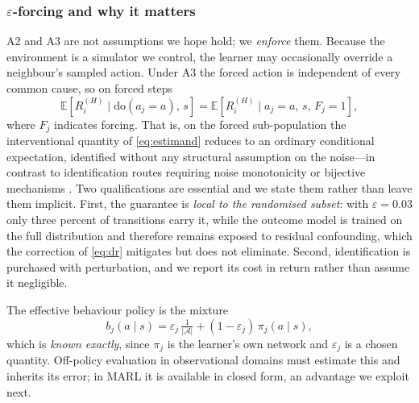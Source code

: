 \documentclass[conference]{IEEEtran}
\begin{document}
\subsubsection{$\varepsilon$-forcing and why it matters}
A2 and A3 are not assumptions we hope hold; we \emph{enforce} them. Because the environment is a simulator we control, the learner may occasionally override a neighbour's sampled action. Under A3 the forced action is independent of every common cause, so on forced steps
\begin{equation}
\mathbb{E}\!\left[R_i^{(H)}\mid \mathrm{do}(a_j=a),\,s\right]
=\mathbb{E}\!\left[R_i^{(H)}\mid a_j=a,\,s,\,F_j=1\right],
\label{eq:identification}
\end{equation}
where $F_j$ indicates forcing. That is, on the forced sub-population the interventional quantity of \eqref{eq:estimand} reduces to an ordinary conditional expectation, identified without any structural assumption on the noise---in contrast to identification routes requiring noise monotonicity or bijective mechanisms \cite{triantafyllou2024ase}. Two qualifications are essential and we state them rather than leave them implicit. First, the guarantee is \emph{local to the randomised subset}: with $\varepsilon=0.03$ only three percent of transitions carry it, while the outcome model is trained on the full distribution and therefore remains exposed to residual confounding, which the correction of \eqref{eq:dr} mitigates but does not eliminate. Second, identification is purchased with perturbation, and we report its cost in return rather than assume it negligible.

The effective behaviour policy is the mixture
\begin{equation}
b_j(a\mid s)=\varepsilon_j\,\tfrac{1}{|\mathcal{A}|}+(1-\varepsilon_j)\,\pi_j(a\mid s),
\label{eq:behaviour}
\end{equation}
which is \emph{known exactly}, since $\pi_j$ is the learner's own network and $\varepsilon_j$ is a chosen quantity. Off-policy evaluation in observational domains must estimate this and inherits its error; in MARL it is available in closed form, an advantage we exploit next.
\end{document}
